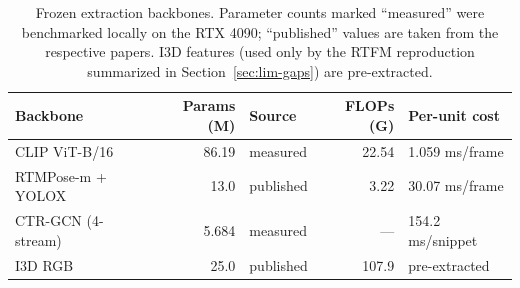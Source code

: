 \begin{table}[t]
\centering
\caption[Trainable-head efficiency benchmarks (RTX 4090)]{Trainable-head efficiency benchmarks (CLIP ViT-B/16 backbone
configuration), measured on a single RTX 4090. Per-sample latency and
throughput refer to one snippet-feature forward pass. The head parameter count
scales with the visual feature dimension: from 0.50M (CLIP ViT-B/16, shown
here as Gated Fusion) up to 1.02M for SigLIP2 Giant.}
\label{tab:efficiency-heads}
\end{table}

\begin{table}[t]
\centering
\caption[Frozen extraction backbones and parameter counts]{Frozen extraction backbones. Parameter counts marked ``measured''
were benchmarked locally on the RTX 4090; ``published'' values are taken from
the respective papers. I3D features (used only by the RTFM reproduction
summarized in Section~\ref{sec:lim-gaps}) are pre-extracted.}
\label{tab:efficiency-backbones}
\begin{tabular}{lrlrl}
\toprule
Backbone & Params (M) & Source & FLOPs (G) & Per-unit cost \\
\midrule
CLIP ViT-B/16 & 86.19 & measured & 22.54 & 1.059 ms/frame \\
RTMPose-m + YOLOX & 13.0 & published & 3.22 & 30.07 ms/frame \\
CTR-GCN (4-stream) & 5.684 & measured & --- & 154.2 ms/snippet \\
I3D RGB & 25.0 & published & 107.9 & pre-extracted \\
\bottomrule
\end{tabular}
\end{table}

